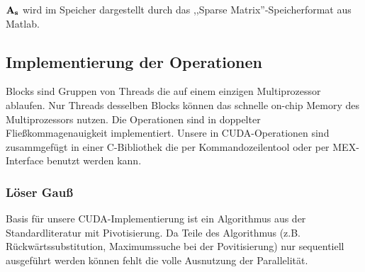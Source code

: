 \documentclass[journal]{IEEEtran}
\begin{document}
$\bf{A_{s}}$ wird im Speicher dargestellt durch das ,,Sparse Matrix''-Speicherformat
aus Matlab. \cite{matlabsparse}

%
%
%

\subsection{Implementierung der Operationen}

Blocks sind Gruppen von Threads die auf einem einzigen Multiprozessor ablaufen.
Nur Threads desselben Blocks können das schnelle on-chip Memory des Multiprozessors nutzen.
Die Operationen sind in doppelter Fließkommagenauigkeit implementiert.
Unsere in CUDA-Operationen sind zusammgefügt in einer \mbox{C-Bibliothek} die
per Kommandozeilentool oder per MEX-Interface \cite{mex} benutzt werden kann.






\subsubsection{Löser Gauß }
Basis für unsere CUDA-Implementierung ist ein Algorithmus aus der
Standardliteratur \cite{sedgewick} mit Pivotisierung.
Da Teile des Algorithmus (z.B. Rückwärtssubstitution, Maximumssuche bei der
Povitisierung) nur sequentiell ausgeführt werden können fehlt die volle
Ausnutzung der Parallelität.
\end{document}
